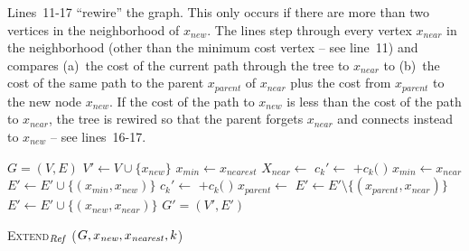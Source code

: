 \documentclass{article}
\begin{document}
Lines~11-17 ``rewire'' the graph.  
This only occurs if there are more than two vertices in the neighborhood of $x_{new}$.  
The lines step through every vertex $x_{near}$ in the neighborhood (other than the minimum cost vertex -- see line~11) and compares (a)~the cost of the current path through the tree to $x_{near}$ to (b)~the cost of the same path to the parent $x_{parent}$ of $x_{near}$ plus the cost from $x_{parent}$ to the new node $x_{new}$. 
If the cost of the path to $x_{new}$ is less than the cost of the path to $x_{near}$, the tree is rewired so that the parent forgets $x_{near}$ and connects instead to $x_{new}$ -- see lines~16-17.

\begin{algorithm}[hbtp]
\begin{algorithmic}[1]
	\Return $G=(V,E)$ 
\EndIf
\State $ V' \leftarrow V \cup \{ x_{new} \} $
\State $ x_{min} \leftarrow x_{nearest} $
\State $ X_{near} \leftarrow $ 
			\State $ c_{k}' \leftarrow $  $ + c_{k}( $  $ ) $ 
			\State $ x_{min} \leftarrow x_{near} $
			\EndIf
		\EndIf
	\EndFor
	\State $ E' \leftarrow E' \cup \{ ( x_{min}, x_{new} ) \} $
{}
	    \State $ c_{k}' \leftarrow $  $ + c_{k}( $  $ ) $ 
			\State $ x_{parent} \leftarrow $ 
			\State $ E' \leftarrow E' \setminus \{ ( x_{parent}, x_{near} ) \} $
			\State $ E' \leftarrow E' \cup \{ ( x_{new}, x_{near} ) \} $
		\EndIf
	\EndIf
\EndFor
\Return $ G' = (V', E') $ 
\end{algorithmic}
\caption{ \textsc{Extend}$_{\it Ref} $ ($ G, x_{\it new}, x_{\it nearest},k$) }
\label{alg:morrtstar:extend:ref}
\end{algorithm} 
\end{document}
